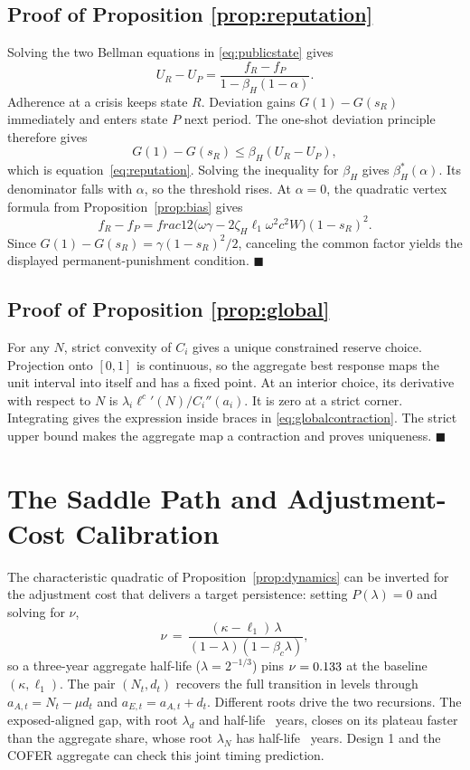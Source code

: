 \documentclass[11pt]{article}
\theoremstyle{definition}
\begin{document}
\subsection{Proof of Proposition \ref{prop:reputation}}
Solving the two Bellman equations in \eqref{eq:publicstate} gives
\[
U_R-U_P=\frac{f_R-f_P}{1-\beta_H(1-\alpha)}.
\]
Adherence at a crisis keeps state $R$. Deviation gains $G(1)-G(s_R)$ immediately and enters state $P$ next period. The one-shot deviation principle therefore gives
\[
G(1)-G(s_R)\leq\beta_H(U_R-U_P),
\]
which is equation~\eqref{eq:reputation}. Solving the inequality for $\beta_H$ gives $\beta_H^*(\alpha)$. Its denominator falls with $\alpha$, so the threshold rises. At $\alpha=0$, the quadratic vertex formula from Proposition~\ref{prop:bias} gives
\[
f_R-f_P=	frac12
\big(\omega\gamma-2\zeta_H\ell_1\omega^2c^2W\big)(1-s_R)^2.
\]
Since $G(1)-G(s_R)=\gamma(1-s_R)^2/2$, canceling the common factor yields the displayed permanent-punishment condition. $\blacksquare$

\subsection{Proof of Proposition \ref{prop:global}}
For any $N$, strict convexity of $C_i$ gives a unique constrained reserve choice. Projection onto $[0,1]$ is continuous, so the aggregate best response maps the unit interval into itself and has a fixed point. At an interior choice, its derivative with respect to $N$ is $\lambda_i{\ell^c}'(N)/C_i''(a_i)$. It is zero at a strict corner. Integrating gives the expression inside braces in \eqref{eq:globalcontraction}. The strict upper bound makes the aggregate map a contraction and proves uniqueness. $\blacksquare$

\section{The Saddle Path and Adjustment-Cost Calibration}\label{app:saddle}

The characteristic quadratic of Proposition~\ref{prop:dynamics} can be inverted for the adjustment cost that delivers a target persistence: setting $P(\lambda) = 0$ and solving for $\nu$,
\[
\nu \,=\, \frac{(\kappa - \ell_1)\,\lambda}{(1 - \lambda)(1 - \beta_c\lambda)},
\]
so a three-year aggregate half-life ($\lambda = 2^{-1/3}$) pins $\nu = 0.133$ at the baseline $(\kappa, \ell_1)$. The pair $(N_t,d_t)$ recovers the full transition in levels through $a_{A,t} = N_t - \mu d_t$ and $a_{E,t} = a_{A,t} + d_t$. Different roots drive the two recursions. The exposed-aligned gap, with root $\lambda_d$ and half-life \HalfLifeD\ years, closes on its plateau faster than the aggregate share, whose root $\lambda_N$ has half-life \HalfLife\ years. Design 1 and the COFER aggregate can check this joint timing prediction.
\end{document}
